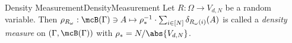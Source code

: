 \begin{mdef}{Density Measurement}{DensityMeasurement}
    Let $R:\Omega\to V_{d,N}$ be a random variable. Then $\rho_{R_\omega}:\mcB(\Gamma)\ni A\mapsto \rho_*^{-1}\cdot\sum_{i\in[N]}\delta_{R_\omega(i)}(A)$ is called a \textit{density measure} on $(\Gamma,\mcB(\Gamma))$ with $\rho_* = N/\abs{V_{d,N}}$.
\end{mdef}